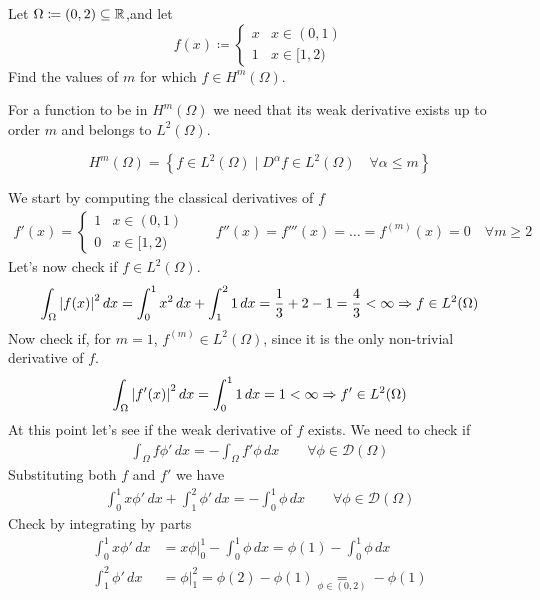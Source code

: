 \newpage
\begin{exercise}
Let \(\Omega \coloneqq (0,2) \subseteq \mathbb{R}\),and let 
\[
    f(x) \coloneqq \begin{cases}
        x & x \in (0, 1) \\
        1 & x \in [1, 2)
    \end{cases}
\]
Find the values of \(m\) for which \(f \in H^m(\Omega)\).
\end{exercise}
For a function to be in \(H^m(\Omega)\) we need that its weak derivative exists up to order \(m\) and belongs to \(L^2(\Omega)\). 
\begin{remark}
    \[
        H^m(\Omega) = \left\{ f \in L^2(\Omega) \mid D^\alpha f \in L^2(\Omega) \quad \forall \alpha \leq m \right\}
    \]
\end{remark}
We start by computing the classical derivatives of \(f\)
\[
    \begin{split}
        f'(x) = \begin{cases}
            1 & x \in (0, 1) \\
            0 & x \in [1, 2)
        \end{cases} \qquad f''(x) = f'''(x)  = \ldots = f^{(m)}(x) = 0 \quad \forall m \geq 2
    \end{split}
\]
Let's now check if \(f \in L^2(\Omega)\).
\[
    \begin{split}
        \int_\Omega \abs{f(x)}^2 \, dx = \int_0^1 x^2 \, dx + \int_1^2 1 \, dx = \frac{1}{3} + 2 - 1 = \frac{4}{3} < \infty \Rightarrow f \in L^2(\Omega)
    \end{split}
\]
Now check if, for \(m = 1\), \(f^{(m)} \in L^2(\Omega)\), since it is the only non-trivial derivative of \(f\).
\[
    \begin{split}
        \int_\Omega \abs{f'(x)}^2 \, dx = \int_0^1 1 \, dx = 1 < \infty \Rightarrow f' \in L^2(\Omega)
    \end{split}
\] 
At this point let's see if the weak derivative of \(f\) exists. We need to check if
\[
    \begin{split}
        \int_\Omega f \phi' \, dx = - \int_\Omega f' \phi \, dx \qquad \forall \phi \in \mathcal{D}(\Omega)
    \end{split}
\]
Substituting both \(f\) and \(f'\) we have
\[
    \begin{split}
        \int_0^1 x \phi' \, dx + \int_1^2 \phi' \, dx = - \int_0^1 \phi \, dx \qquad \forall \phi \in \mathcal{D}(\Omega)
    \end{split}
\]
Check by integrating by parts
\begin{align*}
    \int_0^1 x \phi' \, dx &= \left. x \phi \right|_0^1 - \int_0^1 \phi \, dx = \phi(1) - \int_0^1 \phi \, dx \\
    \int_1^2 \phi' \, dx &= \left. \phi \right|_1^2 = \phi(2) - \phi(1) \underset{\phi \in (0,2)}{=} - \phi(1)
\end{align*}

